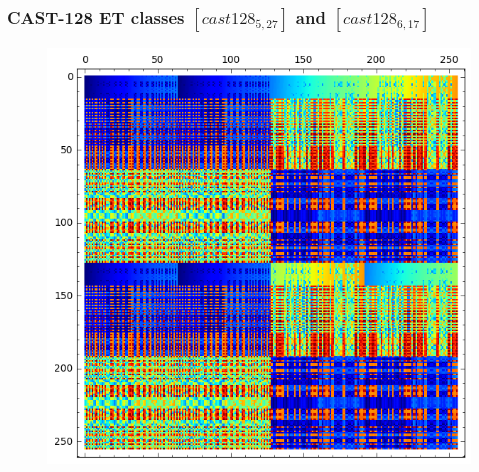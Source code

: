 \documentclass[pdf,sprung,slideColor,nocolorBG]{beamer}
\newenvironment{colortheme}[1]{
\def\ProvidesPackageRCS $##1${\relax}
\renewcommand{\ProcessOptions}{\relax}
\makeatletter

\makeatother
}{}
\begin{document}
\begin{colortheme}{jubata}
\begin{frame}
\begin{figure}
\begin{minipage}{.48\textwidth}
  \label{fig:cast128_5_16_bent_cayley_graph_index_matrix}
\end{minipage}%
\end{figure}
\end{frame}

\begin{frame}
\frametitle{CAST-128 ET classes $[cast128_{5,27}]$ and $[cast128_{6,17}]$}
\begin{figure}
\centering
\begin{minipage}{.48\textwidth}
  \centering
\includegraphics[width=.9\linewidth]{../matrix_plot/cast128_5_27_bent_cayley_graph_index_matrix.png}
  \label{fig:cast128_5_27_bent_cayley_graph_index_matrix}
\end{minipage}%
\begin{minipage}{.48\textwidth}
  \centering

\end{minipage}
\end{figure}
\end{frame}
\end{colortheme}
\end{document}
